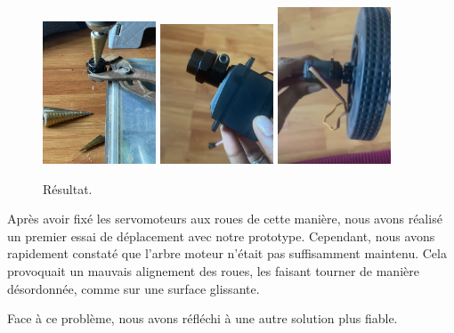 \documentclass[a4paper,12pt]{report}  %
\begin{document}
\begin{figure}[H]
	\centering
	\includegraphics[width=0.3\textwidth]{./attachments/fixage-1.png}
	\includegraphics[width=0.3\textwidth]{./attachments/fixage-2.png}
	\includegraphics[width=0.3\textwidth]{./attachments/fixage-3.png}
	\caption{Résultat.}
\end{figure}



Après avoir fixé les servomoteurs aux roues de cette manière, nous avons réalisé un premier essai de déplacement avec notre prototype. Cependant, nous avons rapidement constaté que l’arbre moteur n’était pas suffisamment maintenu. Cela provoquait un mauvais alignement des roues, les faisant tourner de manière désordonnée, comme sur une surface glissante.

Face à ce problème, nous avons réfléchi à une autre solution plus fiable.
\end{document}

